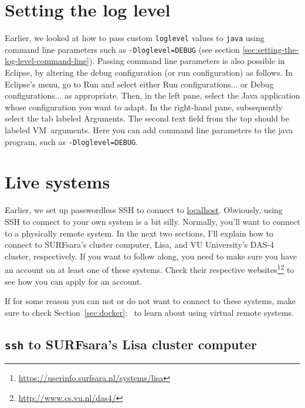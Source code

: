 \documentclass[12pt, a4paper, twoside, openany, titlepage]{book}
\begin{document}
\section{Setting the log level}

Earlier, we looked at how to pass custom \texttt{loglevel} values to \texttt{java} using command line parameters such as \texttt{-Dloglevel=DEBUG} (see section \ref{sec:setting-the-log-level-command-line}). Passing command line parameters is also possible in Eclipse, by altering the debug configuration (or run configuration) as follows. In Eclipse's menu, go to \textsf{Run} and select either \textsf{Run configurations...} or \textsf{Debug configurations...} as appropriate. Then, in the left pane, select the Java application whose configuration you want to adapt. In the right-hand pane, subsequently select the tab labeled \textsf{Arguments}. The second text field from the top should be labeled \textsf{VM~arguments}. Here you can add command line parameters to the java program, such as \texttt{-Dloglevel=DEBUG}.






\section{Live systems}
\label{sec:live-systems}

Earlier, we set up passwordless SSH to connect to \url{localhost}. Obviously, using SSH to connect to your own system is a bit silly. Normally, you'll want to connect to a physically remote system. In the next two sections, I'll explain how to connect to SURFsara's cluster computer, Lisa, and VU University's DAS-4 cluster, respectively. If you want to follow along, you need to make sure you have an account on at least one of these systems. Check their respective websites\footnote{\url{https://userinfo.surfsara.nl/systems/lisa}}\footnote{\url{http://www.cs.vu.nl/das4/}} to see how you can apply for an account.

If for some reason you can not or do not want to connect to these systems, make sure to check Section~\ref{sec:docker}:~\textit{} to learn about using virtual remote systems.

\subsection{\texttt{ssh} to SURFsara's Lisa cluster computer}
\end{document}
